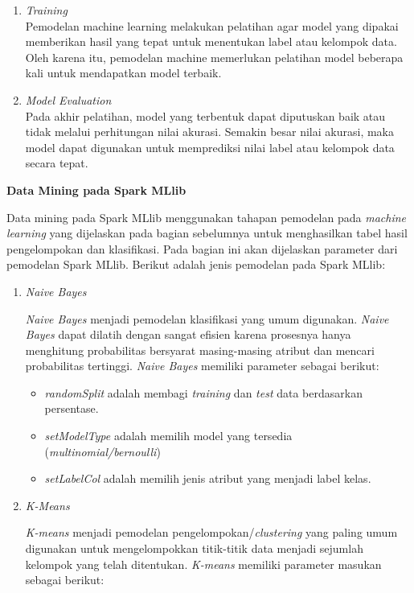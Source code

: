 \documentclass[a4paper,twoside]{article}
\begin{document}
\begin{enumerate}
\begin{enumerate}
\item \textit{Training}\\
Pemodelan machine learning melakukan pelatihan agar model yang dipakai memberikan hasil yang tepat untuk menentukan label atau kelompok data. Oleh karena itu, pemodelan machine memerlukan pelatihan model beberapa kali untuk mendapatkan model terbaik.

\item \textit{Model Evaluation}\\
Pada akhir pelatihan, model yang terbentuk dapat diputuskan baik atau tidak melalui perhitungan nilai akurasi. Semakin besar nilai akurasi, maka model dapat digunakan untuk memprediksi nilai label atau kelompok data secara tepat.
\end{enumerate}

\textbf{Data Mining pada Spark MLlib}

Data mining pada Spark MLlib menggunakan tahapan pemodelan pada \textit{machine learning} yang dijelaskan pada bagian sebelumnya untuk menghasilkan tabel hasil pengelompokan dan klasifikasi. Pada bagian ini akan dijelaskan parameter dari pemodelan Spark MLlib. Berikut adalah jenis pemodelan pada Spark MLlib:

\begin{enumerate}

\item \textit{Naive Bayes}

\textit{Naive Bayes} menjadi pemodelan klasifikasi yang umum digunakan. \textit{Naive Bayes} dapat dilatih dengan sangat efisien karena prosesnya hanya menghitung probabilitas bersyarat masing-masing atribut dan mencari probabilitas tertinggi. \textit{Naive Bayes} memiliki parameter sebagai berikut:
 
\begin{itemize}
\item \textit{randomSplit} adalah membagi \textit{training} dan \textit{test} data berdasarkan persentase.
\item \textit{setModelType} adalah memilih model yang tersedia (\textit{multinomial/bernoulli})
\item \textit{setLabelCol} adalah memilih jenis atribut yang menjadi label kelas.
\end{itemize}

\item \textit{K-Means}

\textit{K-means} menjadi pemodelan pengelompokan/\textit{clustering} yang paling umum digunakan untuk mengelompokkan titik-titik data menjadi sejumlah kelompok yang telah ditentukan. \textit{K-means} memiliki parameter masukan sebagai berikut:


\end{enumerate}
\end{enumerate}
\end{document}
